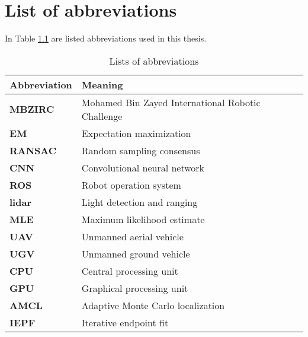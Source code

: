 \chapter{List of abbreviations}\label{ape:abbreviations}

In Table \ref{table:abbreviations} are listed abbreviations used in this thesis.

\begin{table}[!htb]
\centering
\begin{tabular}{ll}
\textbf{Abbreviation} & \textbf{Meaning} \\
\hline
\textbf{MBZIRC} & Mohamed Bin Zayed International Robotic Challenge \\
\textbf{EM} & Expectation maximization \\
\textbf{RANSAC} & Random sampling consensus \\
\textbf{CNN} & Convolutional neural network \\
\textbf{ROS} & Robot operation system \\
\textbf{lidar} & Light detection and ranging \\
\textbf{MLE} & Maximum likelihood estimate \\
\textbf{UAV} & Unmanned aerial vehicle \\
\textbf{UGV} & Unmanned ground vehicle \\
\textbf{CPU} & Central processing unit\\
\textbf{GPU} & Graphical processing unit \\
\textbf{AMCL} & Adaptive Monte Carlo localization \\
\textbf{IEPF} & Iterative endpoint fit \\
\end{tabular}
\caption{Lists of abbreviations}
\label{table:abbreviations}
\end{table}